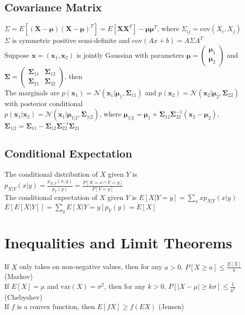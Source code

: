 \documentclass{article}
\newcommand{\V}{\mbox{var}}
\newcommand{\C}{\mbox{cov}}
\begin{document}
\subsection{Covariance Matrix}
$\Sigma = E[(\boldsymbol X - \boldsymbol \mu)(\boldsymbol X - \boldsymbol \mu)^T] = E[\boldsymbol X \boldsymbol X^T] - \boldsymbol \mu \boldsymbol \mu^T$, where $\Sigma_{ij} = \C(X_i, X_j)$ \\
$\Sigma$ is symmetric positive semi-definite and $\C(Ax + b) = A \Sigma A^T$ \\
Suppose $\boldsymbol x = (\boldsymbol x_1, \boldsymbol x_2)$ is jointly Gaussian with parameters $\boldsymbol \mu = \begin{pmatrix} \boldsymbol \mu_1\\ \boldsymbol \mu_2 \end{pmatrix}$ and $\boldsymbol \Sigma = \begin{pmatrix} \boldsymbol \Sigma_{11} & \boldsymbol \Sigma_{12} \\ \boldsymbol \Sigma_{21} & \boldsymbol \Sigma_{22} \end{pmatrix}$, then \\
The marginals are $p(\boldsymbol x_1) = \mathcal{N}(\boldsymbol x_1 | \boldsymbol \mu_1, \boldsymbol \Sigma_{11})$ and $p(\boldsymbol x_2) = \mathcal{N}(\boldsymbol x_2 | \boldsymbol \mu_2, \boldsymbol \Sigma_{22})$ with posterior conditional \\
$p(\boldsymbol x_1 | \boldsymbol x_2) = \mathcal{N}(\boldsymbol x_1 | \boldsymbol \mu_{1|2}, \boldsymbol \Sigma_{1|2})$, where $\boldsymbol \mu_{1|2} = \boldsymbol \mu_1 + \boldsymbol \Sigma_{12}\boldsymbol \Sigma_{22}^{-1}(\boldsymbol x_2 - \boldsymbol \mu_2)$, $\boldsymbol \Sigma_{1|2} = \boldsymbol \Sigma_{11} - \boldsymbol \Sigma_{12}\boldsymbol \Sigma_{22}^{-1}\boldsymbol \Sigma_{21}$

\subsection{Conditional Expectation}
The conditional distribution of $X$ given $Y$ is $p_{X|Y}(x|y) = \frac{p_{X,Y}(x,y)}{p_Y(y)} = \frac{P[X=x \cap Y = y]}{P[Y=y]}$ \\
The conditional expectation of $X$ given $Y$ is $E[X|Y=y] = \sum_x x p_{X|Y}(x|y) $ \\
$E[E[X|Y]] = \sum_yE[X|Y=y]p_Y(y) = E[X]$

\section{Inequalities and Limit Theorems}
If $X$ only takes on non-negative values, then for any $a > 0$, $P[X \geq a] \leq \frac{E[X]}{a}$  (Markov)\\
If $E[X] = \mu$ and $\V(X) = \sigma^2$, then for any $k > 0$, $P[|X - \mu| \geq k \sigma] \leq \frac{1}{k^2}$ (Chebyshev) \\
If $f$ is a convex function, then $E[fX] \geq f(E X)$ (Jensen) 
\end{document}
